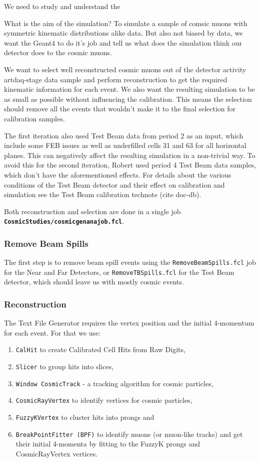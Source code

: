 \documentclass[12pt]{article}
\begin{document}
We need to study and understand the 

What is the aim of the simulation? To simulate a sample of comsic muons with symmetric kinematic distributions alike data. But also not biased by data, we want the Geant4 to do it's job and tell us what does the simulation think our detector does to the cosmic muons.

We want to select well reconstructed cosmic muons out of the detector activity artdaq-stage data sample and perform reconstruction to get the required kinematic information for each event. We also want the resulting simulation to be as small as possible without influencing the calibration. This means the selection should remove all the events that wouldn't make it to the final selection for calibration samples.

The first iteration also used Test Beam data from period 2 as an input, which include some FEB issues as well as underfilled cells 31 and 63 for all horizontal planes. This can negatively affect the resulting simulation in a non-trivial way. To avoid this for the second iteration, Robert used period 4 Test Beam data samples, which don't have the aforementioned effects. For details about the various conditions of the Test Beam detector and their effect on calibration and simulation see the Test Beam calibration technote (cite doc-db).

Both reconstruction and selection are done in a single job \textbf{\texttt{CosmicStudies/cosmicgenanajob.fcl}}.

\subsubsection{Remove Beam Spills}
The first step is to remove beam spill events using the \texttt{RemoveBeamSpills.fcl} job for the Near and Far Detectors, or \texttt{RemoveTBSpills.fcl} for the Test Beam detector, which should leave us with mostly cosmic events.

\subsubsection{Reconstruction}
The Text File Generator requires the vertex position and the initial 4-momentum for each event. For that we use:
\begin{enumerate}
\item \texttt{CalHit} to create Calibrated Cell Hits from Raw Digits,
\item \texttt{Slicer} to group hits into slices,
\item \texttt{Window CosmicTrack} - a tracking algorithm for cosmic particles,
\item \texttt{CosmicRayVertex} to identify vertices for cosmic particles,
\item \texttt{FuzzyKVertex} to cluster hits into prongs and
\item \texttt{BreakPointFitter (BPF)} to identify muons (or muon-like tracks) and get their initial 4-momenta by fitting to the FuzzyK prongs and CosmicRayVertex vertices.
\end{enumerate}
\end{document}
